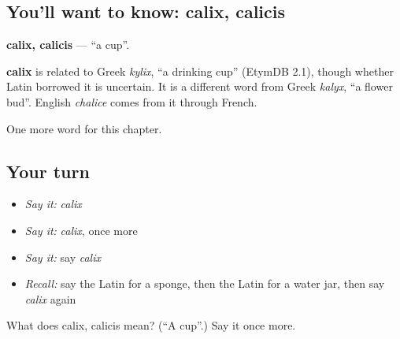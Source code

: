 \subsection*{You'll want to know: calix, calicis}
\textbf{calix, calicis} — \textquotedblleft{}a cup\textquotedblright{}.

\begin{cousinweb}
\textbf{calix} is related to Greek \emph{kylix}, \textquotedblleft{}a drinking cup\textquotedblright{} (EtymDB 2.1), though whether Latin borrowed it is uncertain. It is a different word from Greek \emph{kalyx}, \textquotedblleft{}a flower bud\textquotedblright{}. English \emph{chalice} comes from it through French.
\end{cousinweb}

\begin{grammarlens}[title={What you've built}]
One more word for this chapter.
\end{grammarlens}

\subsection*{Your turn}
\begin{itemize}
\raggedright
  \item \emph{Say it:} \emph{calix}
  \item \emph{Say it:} \emph{calix}, once more
  \item \emph{Say it:} say \emph{calix}
  \item \emph{Recall:} say the Latin for a sponge, then the Latin for a water jar, then say \emph{calix} again
\end{itemize}

\begin{tcolorbox}[breakable,colback=teal!4,colframe=teal!35!black,title={Before you move on}]
What does calix, calicis mean? (\textquotedblleft{}A cup\textquotedblright{}.) Say it once more.
\end{tcolorbox}
